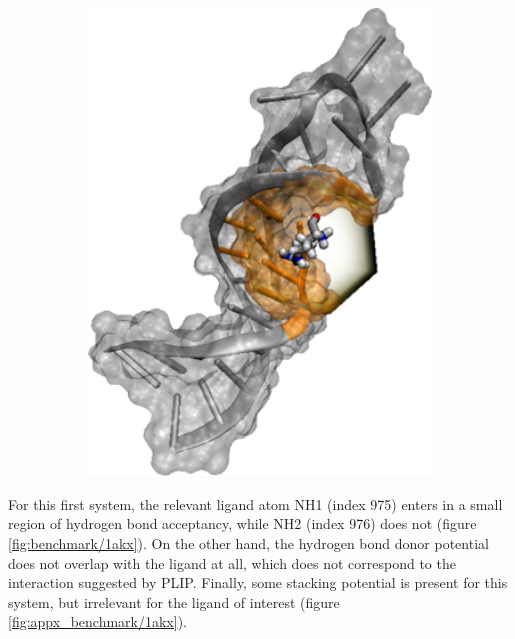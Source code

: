       \begin{figure}[H] \centering
        \begin{subfigure}[c]{0.3\textwidth} \centering
          \includegraphics[width=1\textwidth]{figures/results/ps_rna/1akx.png}
        \end{subfigure}
        \begin{subfigure}[c]{0.3\textwidth} \centering
        \end{subfigure}
      \end{figure}

      For this first system, the relevant ligand atom NH1 (index 975) enters in a small region of hydrogen bond acceptancy, while NH2 (index 976) does not (figure \ref{fig:benchmark/1akx}). On the other hand, the hydrogen bond donor potential does not overlap with the ligand at all, which does not correspond to the interaction suggested by PLIP. Finally, some stacking potential is present for this system, but irrelevant for the ligand of interest (figure \ref{fig:appx_benchmark/1akx}).

